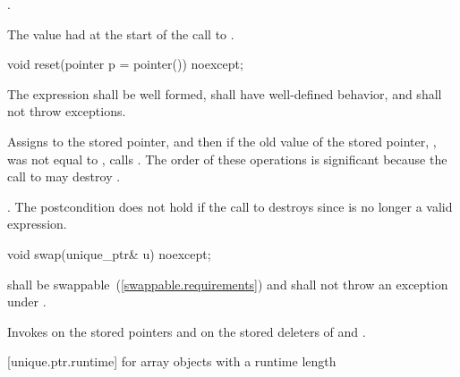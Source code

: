 \begin{itemdescr}
\pnum
\postcondition {}.

\pnum
\returns The value  had at the start of
the call to .
\end{itemdescr}

\begin{itemdecl}
void reset(pointer p = pointer()) noexcept;
\end{itemdecl}

\begin{itemdescr}
\pnum
\requires The expression  shall be well formed, shall have
well-defined behavior, and shall not throw exceptions.

\pnum
\effects Assigns  to the stored pointer, and then if the old value of the
stored pointer, , was not equal to , calls
. \enternote The order of these operations is significant
because the call to  may destroy . \exitnote

\pnum
\postcondition {}.
\enternote The postcondition does not hold if the call to 
destroys  since  is no longer a valid expression.
\exitnote
\end{itemdescr}

\begin{itemdecl}
void swap(unique_ptr& u) noexcept;
\end{itemdecl}

\begin{itemdescr}
\pnum
\requires {} shall be
swappable~(\ref{swappable.requirements}) and shall
not throw an exception
under .

\pnum
\effects Invokes  on the stored pointers and on the stored
deleters of  and .
\end{itemdescr}

[unique.ptr.runtime]{ for array objects with a runtime length}

